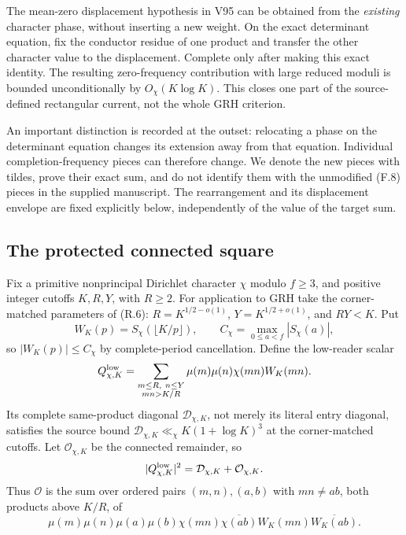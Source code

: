 \documentclass[11pt]{article}
\theoremstyle{definition}
\theoremstyle{remark}
\begin{document}
The mean-zero displacement hypothesis in V95 can be obtained from the
\emph{existing} character phase, without inserting a new weight.
On the exact determinant equation, fix the conductor residue of one
product and transfer the other character value to the displacement.
Complete only after making this exact identity.  The resulting
zero-frequency contribution with large reduced moduli is bounded
unconditionally by \(O_\chi(K\log K)\).  This closes one part of
the source-defined rectangular current, not the whole GRH criterion.

An important distinction is recorded at the outset: relocating a phase
on the determinant equation changes its extension away from that
equation.  Individual completion-frequency pieces can therefore change.
We denote the new pieces with tildes, prove their exact sum, and do not
identify them with the unmodified (F.8) pieces in the supplied manuscript.
The rearrangement and its displacement envelope are fixed explicitly
below, independently of the value of the target sum.

\subsection{The protected connected square}

Fix a primitive nonprincipal Dirichlet character \(\chi\) modulo
\(f\ge3\), and positive integer cutoffs \(K,R,Y\), with \(R\ge2\).
For application to GRH take the corner-matched parameters of (R.6):
\(R=K^{1/2-o(1)}\), \(Y=K^{1/2+o(1)}\), and \(RY<K\).
Put
\[
 W_K(p)=S_\chi(\lfloor K/p\rfloor),\qquad
 C_\chi=\max_{0\le a<f}|S_\chi(a)|,
\]
so \(|W_K(p)|\le C_\chi\) by complete-period cancellation.
Define the low-reader scalar
\begin{equation}
 Q_{\chi,K}^{\rm low}
 =\sum_{\substack{m\le R,\ n\le Y\\ mn>K/R}}
       \mu(m)\mu(n)\chi(mn)W_K(mn).
 \label{eq:f2v96-low-reader}
\end{equation}
Its complete same-product diagonal \(\mathcal D_{\chi,K}\), not
merely its literal entry diagonal, satisfies the source bound
\(\mathcal D_{\chi,K}\ll_\chi K(1+\log K)^3\) at the
corner-matched cutoffs.  Let \(\mathcal O_{\chi,K}\) be the
connected remainder, so
\begin{equation}
 |Q_{\chi,K}^{\rm low}|^2
       =\mathcal D_{\chi,K}+\mathcal O_{\chi,K}.
 \label{eq:f2v96-square}
\end{equation}
Thus \(\mathcal O\) is the sum over ordered pairs
\((m,n),(a,b)\) with \(mn\ne ab\), both products above \(K/R\),
of
\[
 \mu(m)\mu(n)\mu(a)\mu(b)
 \chi(mn)\overline{\chi(ab)}W_K(mn)\overline{W_K(ab)}.
\]
\end{document}
